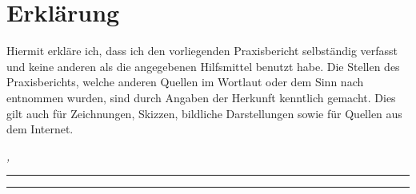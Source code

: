 %
\chapter*{Erklärung}
\label{sec:declaration}
\thispagestyle{empty}

Hiermit erkläre ich, dass ich den vorliegenden Praxisbericht selbständig verfasst und keine anderen als die angegebenen Hilfsmittel benutzt habe.
Die Stellen des Praxisberichts, welche anderen Quellen im Wortlaut oder dem Sinn nach entnommen wurden, sind durch Angaben der Herkunft kenntlich gemacht.
Dies gilt auch für Zeichnungen, Skizzen, bildliche Darstellungen sowie für Quellen aus dem Internet.

\bigskip

\noindent\textit{\thesisUniversityCity, \thesisDate}

\smallskip

\begin{flushright}
	\begin{minipage}{5cm}
		\rule{\textwidth}{1pt}
		\centering\thesisName
	\end{minipage}
\end{flushright}

\medskip

\begin{flushright}
	\begin{minipage}{5cm}
		\rule{\textwidth}{1pt}
		\centering\thesisSecondReviewer
	\end{minipage}
\end{flushright}

